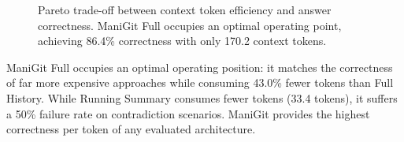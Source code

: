 \begin{figure}[t]
\centering

\caption{Pareto trade-off between context token efficiency and answer correctness. ManiGit Full occupies an optimal operating point, achieving 86.4\% correctness with only 170.2 context tokens.}
\label{fig:efficiency_tradeoff}
\end{figure}

ManiGit Full occupies an optimal operating position: it matches the correctness of far more expensive approaches while consuming 43.0\% fewer tokens than Full History. While Running Summary consumes fewer tokens (33.4 tokens), it suffers a 50\% failure rate on contradiction scenarios. ManiGit provides the highest correctness per token of any evaluated architecture.
